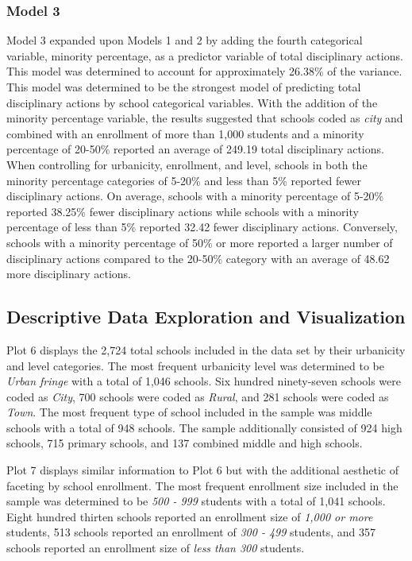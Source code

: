 \documentclass[
  man, fleqn, noextraspace]{apa6}
\begin{document}
\hypertarget{model-3}{%
\subsubsection{Model 3}\label{model-3}}

Model 3 expanded upon Models 1 and 2 by adding the fourth categorical variable, minority percentage, as a predictor variable of total disciplinary actions. This model was determined to account for approximately 26.38\% of the variance. This model was determined to be the strongest model of predicting total disciplinary actions by school categorical variables. With the addition of the minority percentage variable, the results suggested that schools coded as \emph{city} and combined with an enrollment of more than 1,000 students and a minority percentage of 20-50\% reported an average of 249.19 total disciplinary actions. When controlling for urbanicity, enrollment, and level, schools in both the minority percentage categories of 5-20\% and less than 5\% reported fewer disciplinary actions. On average, schools with a minority percentage of 5-20\% reported 38.25\% fewer disciplinary actions while schools with a minority percentage of less than 5\% reported 32.42 fewer disciplinary actions. Conversely, schools with a minority percentage of 50\% or more reported a larger number of disciplinary actions compared to the 20-50\% category with an average of 48.62 more disciplinary actions.

\hypertarget{descriptive-data-exploration-and-visualization-1}{%
\subsection{Descriptive Data Exploration and Visualization}\label{descriptive-data-exploration-and-visualization-1}}

Plot 6 displays the 2,724 total schools included in the data set by their urbanicity and level categories. The most frequent urbanicity level was determined to be \emph{Urban fringe} with a total of 1,046 schools. Six hundred ninety-seven schools were coded as \emph{City}, 700 schools were coded as \emph{Rural}, and 281 schools were coded as \emph{Town}. The most frequent type of school included in the sample was middle schools with a total of 948 schools. The sample additionally consisted of 924 high schools, 715 primary schools, and 137 combined middle and high schools.

Plot 7 displays similar information to Plot 6 but with the additional aesthetic of faceting by school enrollment. The most frequent enrollment size included in the sample was determined to be \emph{500 - 999} students with a total of 1,041 schools. Eight hundred thirten schools reported an enrollment size of \emph{1,000 or more} students, 513 schools reported an enrollment of \emph{300 - 499} students, and 357 schools reported an enrollment size of \emph{less than 300} students.
\end{document}
